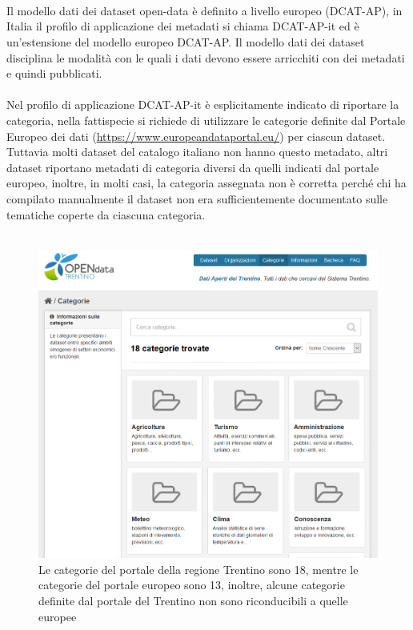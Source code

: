 \documentclass{article}
\theoremstyle{plain}
\theoremstyle{definition}
\begin{document}
\\
\\
\\
Il modello dati dei dataset open-data è definito a livello europeo (DCAT-AP), in Italia il profilo di applicazione dei metadati si chiama DCAT-AP-it ed è un'estensione del modello europeo DCAT-AP. Il modello dati dei dataset disciplina le modalità con le quali i dati devono essere arricchiti con dei metadati e quindi pubblicati.
\\
\\
Nel profilo di applicazione DCAT-AP-it è esplicitamente indicato di riportare la categoria, nella fattispecie si richiede di utilizzare le categorie definite dal Portale Europeo dei dati (\url{https://www.europeandataportal.eu/}) per ciascun dataset.  Tuttavia molti dataset del catalogo italiano non hanno questo metadato, altri dataset riportano metadati di categoria diversi da quelli indicati dal portale europeo, inoltre, in molti casi, la categoria assegnata non è corretta perché chi ha compilato manualmente il dataset non era sufficientemente documentato sulle tematiche coperte da ciascuna categoria. 
\\
\\
\begin{figure}[htbp]
\begin{center}
\includegraphics[scale=0.50]{img/cat2.png}
\caption{Le categorie del portale della regione Trentino sono 18, mentre le categorie del portale europeo sono 13, inoltre, alcune categorie definite dal portale del Trentino non sono riconducibili a quelle europee}
\end{center}
\end{figure}
\end{document}
